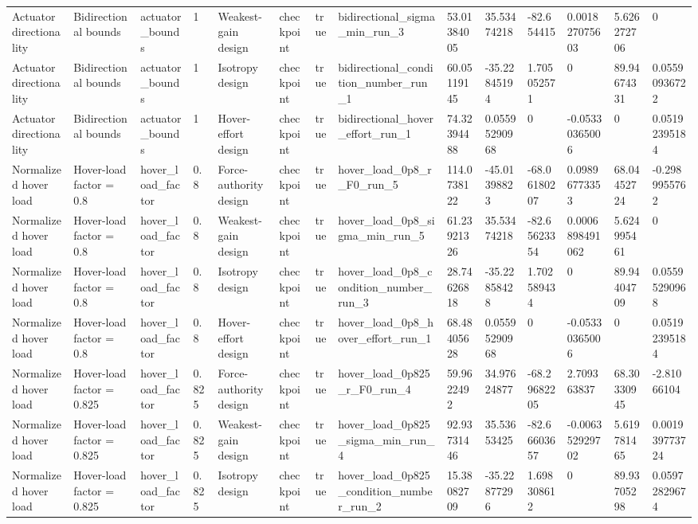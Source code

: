 \begin{tabular}{@{}llllllllllllll@{}}
Actuator directionality & Bidirectional bounds & actuator\_bounds & 1 & Weakest-gain design & checkpoint & true & bidirectional\_sigma\_min\_run\_3 & 53.01384005 & 35.53474218 & -82.654415 & 0.001827075603 & 5.626272706 & 0 \\
Actuator directionality & Bidirectional bounds & actuator\_bounds & 1 & Isotropy design & checkpoint & true & bidirectional\_condition\_number\_run\_1 & 60.05119145 & -35.22845194 & 1.705052571 & 0 & 89.94674331 & 0.05590936722 \\
Actuator directionality & Bidirectional bounds & actuator\_bounds & 1 & Hover-effort design & checkpoint & true & bidirectional\_hover\_effort\_run\_1 & 74.32394488 & 0.05595290968 & 0 & -0.05330365006 & 0 & 0.05192395184 \\
Normalized hover load & Hover-load factor = 0.8 & hover\_load\_factor & 0.8 & Force-authority design & checkpoint & true & hover\_load\_0p8\_r\_F0\_run\_5 & 114.0738122 & -45.01398823 & -68.06180207 & 0.09896773353 & 68.04452724 & -0.2989955762 \\
Normalized hover load & Hover-load factor = 0.8 & hover\_load\_factor & 0.8 & Weakest-gain design & checkpoint & true & hover\_load\_0p8\_sigma\_min\_run\_5 & 61.23921326 & 35.53474218 & -82.65623354 & 0.0006898491062 & 5.624995461 & 0 \\
Normalized hover load & Hover-load factor = 0.8 & hover\_load\_factor & 0.8 & Isotropy design & checkpoint & true & hover\_load\_0p8\_condition\_number\_run\_3 & 28.74626818 & -35.22858428 & 1.702589434 & 0 & 89.94404709 & 0.05595290968 \\
Normalized hover load & Hover-load factor = 0.8 & hover\_load\_factor & 0.8 & Hover-effort design & checkpoint & true & hover\_load\_0p8\_hover\_effort\_run\_1 & 68.48405628 & 0.05595290968 & 0 & -0.05330365006 & 0 & 0.05192395184 \\
Normalized hover load & Hover-load factor = 0.825 & hover\_load\_factor & 0.825 & Force-authority design & checkpoint & true & hover\_load\_0p825\_r\_F0\_run\_4 & 59.9622492 & 34.97624877 & -68.29682205 & 2.709363837 & 68.30330945 & -2.81066104 \\
Normalized hover load & Hover-load factor = 0.825 & hover\_load\_factor & 0.825 & Weakest-gain design & checkpoint & true & hover\_load\_0p825\_sigma\_min\_run\_4 & 92.93731446 & 35.53653425 & -82.66603657 & -0.006352929702 & 5.619781465 & 0.001939773724 \\
Normalized hover load & Hover-load factor = 0.825 & hover\_load\_factor & 0.825 & Isotropy design & checkpoint & true & hover\_load\_0p825\_condition\_number\_run\_2 & 15.38082709 & -35.22877296 & 1.698308612 & 0 & 89.93705298 & 0.05972829674 \\

\end{tabular}
